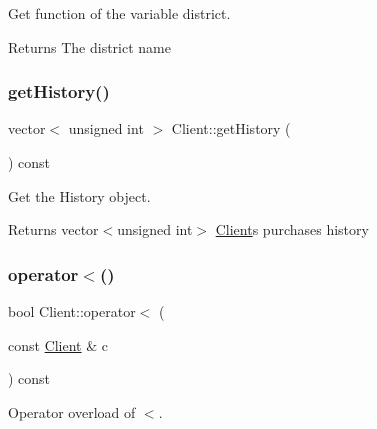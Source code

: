 Get function of the variable district. 

\begin{DoxyReturn}{Returns}
The district name 
\end{DoxyReturn}
\mbox{\label{classClient_a5a2d79bb60bb1846a14263d156654c36}} 
\subsubsection{\texorpdfstring{get\+History()}{getHistory()}}
{\footnotesize\ttfamily vector$<$ unsigned int $>$ Client\+::get\+History (\begin{DoxyParamCaption}{ }\end{DoxyParamCaption}) const}



Get the History object. 

\begin{DoxyReturn}{Returns}
vector$<$unsigned int$>$ \hyperlink{classClient}{Client}\textquotesingle{}s purchases history 
\end{DoxyReturn}
\mbox{\label{classClient_ada079699bae9cf8b0b729c82f0940487}} 
\subsubsection{\texorpdfstring{operator$<$()}{operator<()}}
{\footnotesize\ttfamily bool Client\+::operator$<$ (\begin{DoxyParamCaption}\item[{const \hyperlink{classClient}{Client} \&}]{c }\end{DoxyParamCaption}) const}



Operator overload of $<$. 



